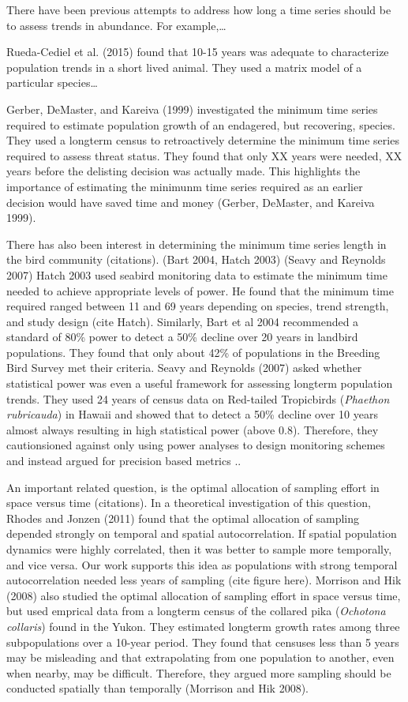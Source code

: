 \documentclass[12pt,]{article}
\begin{document}
There have been previous attempts to address how long a time series
should be to assess trends in abundance. For example,\ldots{}

Rueda-Cediel et al. (2015) found that 10-15 years was adequate to
characterize population trends in a short lived animal. They used a
matrix model of a particular species\ldots{}

Gerber, DeMaster, and Kareiva (1999) investigated the minimum time
series required to estimate population growth of an endagered, but
recovering, species. They used a longterm census to retroactively
determine the minimum time series required to assess threat status. They
found that only XX years were needed, XX years before the delisting
decision was actually made. This highlights the importance of estimating
the minimunm time series required as an earlier decision would have
saved time and money (Gerber, DeMaster, and Kareiva 1999).

There has also been interest in determining the minimum time series
length in the bird community (citations). (Bart 2004, Hatch 2003) (Seavy
and Reynolds 2007) Hatch 2003 used seabird monitoring data to estimate
the minimum time needed to achieve appropriate levels of power. He found
that the minimum time required ranged between 11 and 69 years depending
on species, trend strength, and study design (cite Hatch). Similarly,
Bart et al 2004 recommended a standard of 80\% power to detect a 50\%
decline over 20 years in landbird populations. They found that only
about 42\% of populations in the Breeding Bird Survey met their
criteria. Seavy and Reynolds (2007) asked whether statistical power was
even a useful framework for assessing longterm population trends. They
used 24 years of census data on Red-tailed Tropicbirds
(\emph{Phaethon rubricauda}) in Hawaii and showed that to detect a 50\%
decline over 10 years almost always resulting in high statistical power
(above 0.8). Therefore, they cautionsioned against only using power
analyses to design monitoring schemes and instead argued for precision
based metrics ..

An important related question, is the optimal allocation of sampling
effort in space versus time (citations). In a theoretical investigation
of this question, Rhodes and Jonzen (2011) found that the optimal
allocation of sampling depended strongly on temporal and spatial
autocorrelation. If spatial population dynamics were highly correlated,
then it was better to sample more temporally, and vice versa. Our work
supports this idea as populations with strong temporal autocorrelation
needed less years of sampling (cite figure here). Morrison and Hik
(2008) also studied the optimal allocation of sampling effort in space
versus time, but used emprical data from a longterm census of the
collared pika (\emph{Ochotona collaris}) found in the Yukon. They
estimated longterm growth rates among three subpopulations over a
10-year period. They found that censuses less than 5 years may be
misleading and that extrapolating from one population to another, even
when nearby, may be difficult. Therefore, they argued more sampling
should be conducted spatially than temporally (Morrison and Hik 2008).
\end{document}
